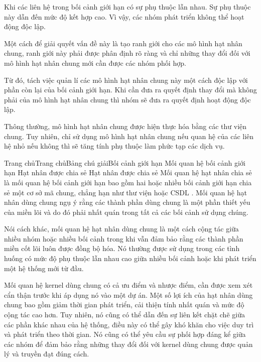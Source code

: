 Khi các liên hệ trong bối cảnh giới hạn có sự phụ thuộc lẫn nhau. Sự phụ thuộc này dẫn đến mức độ kết hợp cao. Vì vậy, các nhóm phát triển không thể hoạt động độc lập.

Một cách để giải quyết vấn đề này là tạo ranh giới cho các mô hình hạt nhân chung, ranh giới này phải được phân định rõ ràng và chỉ những thay đổi đối với mô hình hạt nhân chung mới cần được các nhóm phối hợp.

Từ đó, tách việc quản lí các mô hình hạt nhân chung này một cách độc lập với phần còn lại của bối cảnh giới hạn. Khi cần đưa ra quyết định thay đổi mà không phải của mô hình hạt nhân chung thì nhóm sẽ đưa ra quyết định hoạt động độc lập.

Thông thường, mô hình hạt nhân chung được hiện thực hóa bằng các thư viện chung. Tuy nhiên, chỉ sử dụng mô hình hạt nhân chung nếu quan hệ của các liên hệ nhỏ nếu không thì sẽ tăng tính phụ thuộc làm phức tạp các dịch vụ.


Trang chủTrang chủBảng chú giảiBối cảnh giới hạn Mối quan hệ bối cảnh giới hạn Hạt nhân được chia sẻ
Hạt nhân được chia sẻ
Mối quan hệ hạt nhân chia sẻ là mối quan hệ bối cảnh giới hạn bao gồm hai hoặc nhiều bối cảnh giới hạn chia sẻ một cơ sở mã chung, chẳng hạn như thư viện hoặc CSDL . Mối quan hệ hạt nhân dùng chung ngụ ý rằng các thành phần dùng chung là một phần thiết yếu của miền lõi và do đó phải nhất quán trong tất cả các bối cảnh sử dụng chúng.

Nói cách khác, mối quan hệ hạt nhân dùng chung là một cách cộng tác giữa nhiều nhóm hoặc nhiều bối cảnh trong khi vẫn đảm bảo rằng các thành phần miền cốt lõi luôn được đồng bộ hóa. Nó thường được sử dụng trong các tình huống có mức độ phụ thuộc lẫn nhau cao giữa nhiều bối cảnh hoặc khi phát triển một hệ thống mới từ đầu.

Mối quan hệ kernel dùng chung có cả ưu điểm và nhược điểm, cần được xem xét cẩn thận trước khi áp dụng nó vào một dự án. Một số lợi ích của hạt nhân dùng chung bao gồm giảm thời gian phát triển, cải thiện tính nhất quán và mức độ cộng tác cao hơn. Tuy nhiên, nó cũng có thể dẫn đến sự liên kết chặt chẽ giữa các phần khác nhau của hệ thống, điều này có thể gây khó khăn cho việc duy trì và phát triển theo thời gian. Nó cũng có thể yêu cầu sự phối hợp đáng kể giữa các nhóm để đảm bảo rằng những thay đổi đối với kernel dùng chung được quản lý và truyền đạt đúng cách.


